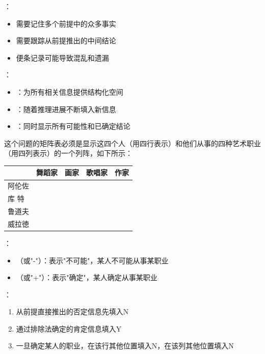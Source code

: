 \begin{theorembox}[title=矩阵法的优势]
：
\begin{itemize}
  \item 需要记住多个前提中的众多事实
  \item 需要跟踪从前提推出的中间结论
  \item 便条记录可能导致混乱和遗漏
\end{itemize}

：
\begin{itemize}
  \item {}：为所有相关信息提供结构化空间
  \item {}：随着推理进展不断填入新信息
  \item {}：同时显示所有可能性和已确定结论
\end{itemize}
\end{theorembox}

这个问题的矩阵表必须是显示这四个人（用四行表示）和他们从事的四种艺术职业（用四列表示）的一个列阵，如下所示：

\begin{center}
\begin{tabular}{|l|l|l|l|l|}
\hline
 & 舞蹈家 & 画家 & 歌唱家 & 作家 \\
\hline
阿伦佐 &  &  &  &  \\
\hline
库 特 &  &  &  &  \\
\hline
鲁道夫 &  &  &  &  \\
\hline
威拉徳 &  &  &  &  \\
\hline
\end{tabular}
\end{center}

\begin{theorembox}[title=矩阵填写规则]
：
\begin{itemize}
  \item {}（或"-"）：表示"不可能"，某人不可能从事某职业
  \item {}（或"+"）：表示"确定"，某人确定从事某职业
\end{itemize}

：
\begin{enumerate}
  \item 从前提直接推出的否定信息先填入N
  \item 通过排除法确定的肯定信息填入Y
  \item 一旦确定某人的职业，在该行其他位置填入N，在该列其他位置填入N
\end{enumerate}
\end{theorembox}

